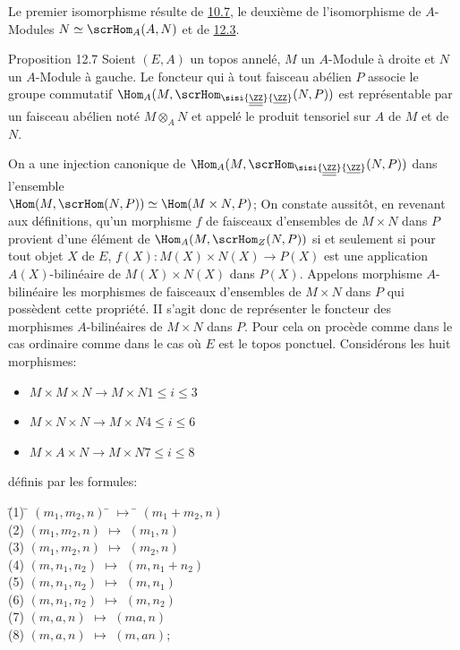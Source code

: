 Le premier isomorphisme résulte de \hyperref[IV.cor10.7]{10.7}, le deuxième de
l'isomorphisme de $A$-Modules $N\simeq \scrHom_A(A,N)$ et de
\hyperref[IV.prop12.3]{12.3}.

\begin{enonce*}{Proposition 12.7}
Soient $(E,A)$ un topos annelé, $M$ un $A$-Module à droite et $N$ un
$A$-Module à gauche. Le foncteur qui à tout faisceau abélien $P$
associe le groupe commutatif
$\Hom_A(M,\scrHom_{\sisi{\underline{\underline{\ZZ}}}{\underline{\ZZ}}}(N,P))$ est représentable par
un faisceau abélien noté $M\otimes_A N$ et appelé le produit
tensoriel sur $A$ de $M$ et de $N$.
\end{enonce*}

On a une injection canonique de $\Hom_A(M,\scrHom_{\sisi{\underline{\underline{\ZZ}}}{\underline{\ZZ}}}(N,P))$ dans
l'ensemble \\ $\Hom(M,\scrHom(N,P))\simeq \Hom(M\times N, P)$; On
constate aussitôt, en revenant aux définitions, qu'un morphisme $f$
de faisceaux d'ensembles de $M\times N$ dans $P$ provient d'une
élément de $\Hom_A(M,\scrHom_Z(N,P))$ si et seulement si pour tout
objet $X$ de $E$, $f(X):M(X)\times N(X)\rightarrow P(X)$ est une
application\pageoriginale $A(X)$-bilinéaire de $M(X)\times N(X)$
dans $P(X)$. Appelons morphisme $A$-bilinéaire les morphismes de
faisceaux d'ensembles de $M\times N$ dans $P$ qui possèdent cette
propriété. II s'agit donc de représenter le foncteur des morphismes
$A$-bilinéaires de $M\times N$ dans $P$. Pour cela on procède comme
dans le cas ordinaire \ie comme dans le cas où $E$ est le topos
ponctuel. Considérons les huit morphismes:
\begin{itemize}
\item[(i):] $M\times M\times N \longrightarrow M\times N$\qquad $1\leq
i\leq 3$

\item[(i):] $M\times N\times N\longrightarrow M\times N$\qquad $4\leq
i\leq 6$

\item[(i):] $M\times A\times N\longrightarrow M\times N$\qquad $7\leq
i\leq 8$
\end{itemize}
définis par les formules:
\begin{tabbing}
\quad\= (1) \= $(m_1, m_2, n)$ \= $\longmapsto$ \= $(m_1+m_2, n)$\\
\> (2) \> $(m_1, m_2, n)$ \> $\longmapsto$ \> $(m_1, n)$\\
\> (3) \> $(m_1, m_2, n)$ \> $\longmapsto$ \> $(m_2, n)$\\
\> (4) \> $(m, n_1, n_2)$ \> $\longmapsto$ \> $(m, n_1+n_2)$\\
\> (5) \> $(m, n_1, n_2)$ \> $\longmapsto$ \> $(m, n_1)$\\
\> (6) \> $(m, n_1, n_2)$ \> $\longmapsto$ \> $(m, n_2)$\\
\> (7) \> $(m, a, n)$ \> $\longmapsto$ \> $(ma, n)$\\
\> (8) \> $(m, a, n)$ \> $\longmapsto$ \> $(m, an)$;
\end{tabbing}
